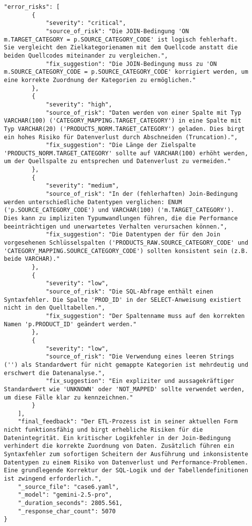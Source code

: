 \begin{lstlisting}[caption={Ausgabe: GEMINI 2.5 Pro Anwendungsfall 6 Robustheitsdurchlauf},label={gemini_case6_prompt3}]
    "error_risks": [
        {
            "severity": "critical",
            "source_of_risk": "Die JOIN-Bedingung 'ON m.TARGET_CATEGORY = p.SOURCE_CATEGORY_CODE' ist logisch fehlerhaft. Sie vergleicht den Zielkategorienamen mit dem Quellcode anstatt die beiden Quellcodes miteinander zu vergleichen.",
            "fix_suggestion": "Die JOIN-Bedingung muss zu 'ON m.SOURCE_CATEGORY_CODE = p.SOURCE_CATEGORY_CODE' korrigiert werden, um eine korrekte Zuordnung der Kategorien zu ermöglichen."
        },
        {
            "severity": "high",
            "source_of_risk": "Daten werden von einer Spalte mit Typ VARCHAR(100) ('CATEGORY_MAPPING.TARGET_CATEGORY') in eine Spalte mit Typ VARCHAR(20) ('PRODUCTS_NORM.TARGET_CATEGORY') geladen. Dies birgt ein hohes Risiko für Datenverlust durch Abschneiden (Truncation).",
            "fix_suggestion": "Die Länge der Zielspalte 'PRODUCTS_NORM.TARGET_CATEGORY' sollte auf VARCHAR(100) erhöht werden, um der Quellspalte zu entsprechen und Datenverlust zu vermeiden."
        },
        {
            "severity": "medium",
            "source_of_risk": "In der (fehlerhaften) Join-Bedingung werden unterschiedliche Datentypen verglichen: ENUM ('p.SOURCE_CATEGORY_CODE') und VARCHAR(100) ('m.TARGET_CATEGORY'). Dies kann zu impliziten Typumwandlungen führen, die die Performance beeinträchtigen und unerwartetes Verhalten verursachen können.",
            "fix_suggestion": "Die Datentypen der für den Join vorgesehenen Schlüsselspalten ('PRODUCTS_RAW.SOURCE_CATEGORY_CODE' und 'CATEGORY_MAPPING.SOURCE_CATEGORY_CODE') sollten konsistent sein (z.B. beide VARCHAR)."
        },
        {
            "severity": "low",
            "source_of_risk": "Die SQL-Abfrage enthält einen Syntaxfehler. Die Spalte 'PROD_ID' in der SELECT-Anweisung existiert nicht in den Quelltabellen.",
            "fix_suggestion": "Der Spaltenname muss auf den korrekten Namen 'p.PRODUCT_ID' geändert werden."
        },
        {
            "severity": "low",
            "source_of_risk": "Die Verwendung eines leeren Strings ('') als Standardwert für nicht gemappte Kategorien ist mehrdeutig und erschwert die Datenanalyse.",
            "fix_suggestion": "Ein expliziter und aussagekräftiger Standardwert wie 'UNKNOWN' oder 'NOT_MAPPED' sollte verwendet werden, um diese Fälle klar zu kennzeichnen."
        }
    ],
    "final_feedback": "Der ETL-Prozess ist in seiner aktuellen Form nicht funktionsfähig und birgt erhebliche Risiken für die Datenintegrität. Ein kritischer Logikfehler in der Join-Bedingung verhindert die korrekte Zuordnung von Daten. Zusätzlich führen ein Syntaxfehler zum sofortigen Scheitern der Ausführung und inkonsistente Datentypen zu einem Risiko von Datenverlust und Performance-Problemen. Eine grundlegende Korrektur der SQL-Logik und der Tabellendefinitionen ist zwingend erforderlich.",
    "_source_file": "case6.yaml",
    "_model": "gemini-2.5-pro",
    "_duration_seconds": 2805.561,
    "_response_char_count": 5070
}
\end{lstlisting}

